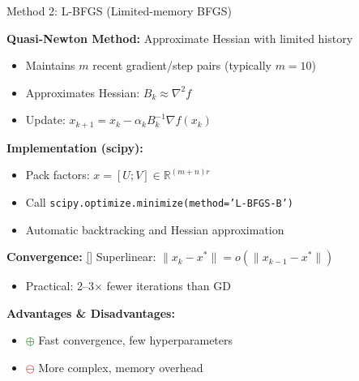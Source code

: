 \documentclass[aspectratio=169,usenames,dvipsnames]{beamer}
\begin{document}
\begin{frame}{Method 2: L-BFGS (Limited-memory BFGS)}

\textbf{Quasi-Newton Method:} Approximate Hessian with limited history
\begin{itemize}
  \item Maintains $m$ recent gradient/step pairs (typically $m = 10$)
  \item Approximates Hessian: $B_k \approx \nabla^2 f$
  \item Update: $x_{k+1} = x_k - \alpha_k B_k^{-1} \nabla f(x_k)$
\end{itemize}

\vspace{0.3cm}

\textbf{Implementation (scipy):}
\begin{itemize}
  \item Pack factors: $x = [U; V] \in \mathbb{R}^{(m+n)r}$
  \item Call \texttt{scipy.optimize.minimize(method='L-BFGS-B')}
  \item Automatic backtracking and Hessian approximation
\end{itemize}

\vspace{0.3cm}

\textbf{Convergence:} \hyperlink{app:lbfgs_convergence}{[\checkmark]} Superlinear: $\|x_k - x^*\| = o(\|x_{k-1} - x^*\|)$
\begin{itemize}
  \item Practical: 2--3$\times$ fewer iterations than GD
\end{itemize}

\vspace{0.3cm}

\textbf{Advantages \& Disadvantages:}
\begin{itemize}
  \item \textcolor{green}{$\oplus$} Fast convergence, few hyperparameters
  \item \textcolor{red}{$\ominus$} More complex, memory overhead
\end{itemize}

\end{frame}
\end{document}
